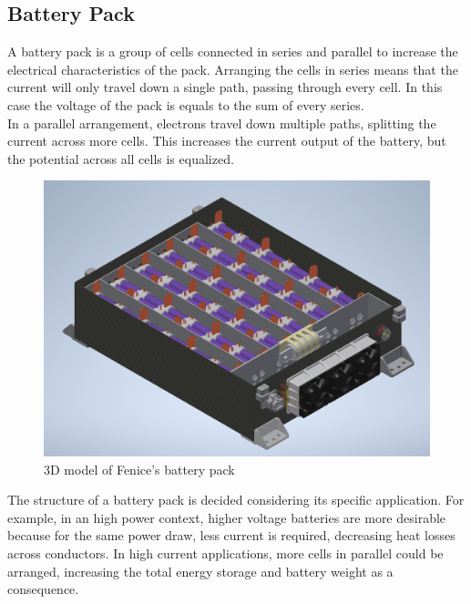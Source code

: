 \subsection{Battery Pack}
A battery pack is a group of cells connected in series and parallel to increase the electrical characteristics of the pack. Arranging the cells in series means that the current will only travel down a single path, passing through every cell. In this case the voltage of the pack is equals to the sum of every series.\\
In a parallel arrangement, electrons travel down multiple paths, splitting the current across more cells. This increases the current output of the battery, but the potential across all cells is equalized.
\begin{figure}[h]
    \centering
    \includegraphics[scale=0.4]{pictures/pack.png}
    \caption{3D model of Fenice's battery pack}
    \label{fig:pack}
\end{figure}
The structure of a battery pack is decided considering its specific application. For example, in an high power context, higher voltage batteries are more desirable because for the same power draw, less current is required, decreasing heat losses across conductors. In high current applications, more cells in parallel could be arranged, increasing the total energy storage and battery weight as a consequence.

